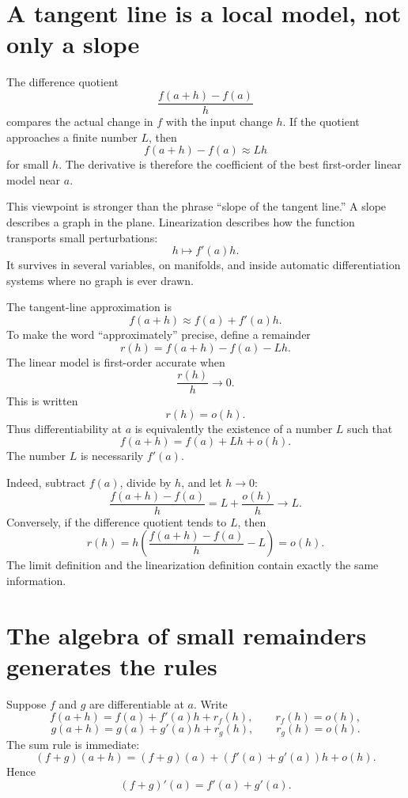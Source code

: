 
\section{A tangent line is a local model, not only a slope}

The difference quotient
\[
  \frac{f(a+h)-f(a)}{h}
\]
compares the actual change in \(f\) with the input change \(h\).  If the quotient approaches a finite number \(L\), then
\[
  f(a+h)-f(a)\approx Lh
\]
for small \(h\).  The derivative is therefore the coefficient of the best first-order linear model near \(a\).

This viewpoint is stronger than the phrase ``slope of the tangent line.''  A slope describes a graph in the plane.  Linearization describes how the function transports small perturbations:
\[
  h\longmapsto f'(a)h.
\]
It survives in several variables, on manifolds, and inside automatic differentiation systems where no graph is ever drawn.

The tangent-line approximation is
\[
  f(a+h)\approx f(a)+f'(a)h.
\]
To make the word ``approximately'' precise, define a remainder
\[
  r(h)=f(a+h)-f(a)-Lh.
\]
The linear model is first-order accurate when
\[
  \frac{r(h)}{h}\longrightarrow0.
\]
This is written
\[
  r(h)=o(h).
\]
Thus differentiability at \(a\) is equivalently the existence of a number \(L\) such that
\[
  \boxed{
  f(a+h)=f(a)+Lh+o(h).}
\]
The number \(L\) is necessarily \(f'(a)\).

Indeed, subtract \(f(a)\), divide by \(h\), and let \(h\to0\):
\[
  \frac{f(a+h)-f(a)}{h}
  =L+\frac{o(h)}{h}
  \longrightarrow L.
\]
Conversely, if the difference quotient tends to \(L\), then
\[
  r(h)=h\left(
    \frac{f(a+h)-f(a)}{h}-L
  \right)=o(h).
\]
The limit definition and the linearization definition contain exactly the same information.

\section{The algebra of small remainders generates the rules}

Suppose \(f\) and \(g\) are differentiable at \(a\).  Write
\[
  f(a+h)=f(a)+f'(a)h+r_f(h),
  \qquad r_f(h)=o(h),
\]
\[
  g(a+h)=g(a)+g'(a)h+r_g(h),
  \qquad r_g(h)=o(h).
\]
The sum rule is immediate:
\[
  (f+g)(a+h)
  =(f+g)(a)+(f'(a)+g'(a))h+o(h).
\]
Hence
\[
  (f+g)'(a)=f'(a)+g'(a).
\]


